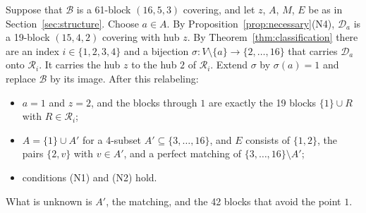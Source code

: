 \documentclass[11pt]{amsart}
\theoremstyle{definition}
\theoremstyle{remark}
\newcommand{\cB}{\mathcal{B}}
\newcommand{\cD}{\mathcal{D}}
\newcommand{\cR}{\mathcal{R}}
\begin{document}
Suppose that $\cB$ is a 61-block $(16,5,3)$ covering, and let $z$, $A$, $M$,
$E$ be as in Section~\ref{sec:structure}. Choose $a\in A$. By
Proposition~\ref{prop:necessary}(N4), $\cD_a$ is a 19-block $(15,4,2)$
covering with hub $z$. By Theorem~\ref{thm:classification} there are an index
$i\in\{1,2,3,4\}$ and a bijection $\sigma\colon V\setminus\{a\}\to
\{2,\dots,16\}$ that carries $\cD_a$ onto $\cR_i$. It carries the hub $z$ to
the hub $2$ of $\cR_i$. Extend $\sigma$ by $\sigma(a)=1$ and replace $\cB$ by
its image. After this relabeling:
\begin{itemize}
\item $a=1$ and $z=2$, and the blocks through $1$ are exactly the 19 blocks
$\{1\}\cup R$ with $R\in\cR_i$;
\item $A=\{1\}\cup A'$ for a 4-subset $A'\subseteq\{3,\dots,16\}$, and $E$
consists of $\{1,2\}$, the pairs $\{2,v\}$ with $v\in A'$, and a perfect
matching of $\{3,\dots,16\}\setminus A'$;
\item conditions (N1) and (N2) hold.
\end{itemize}
What is unknown is $A'$, the matching, and the 42 blocks that avoid the
point $1$.
\end{document}
